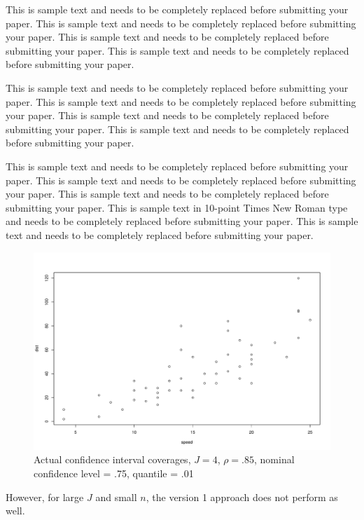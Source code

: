 \documentclass{asaproc}
\begin{document}
This is sample text and needs to be completely replaced before submitting your paper. This is sample text and needs to be completely replaced before submitting your paper. This is sample text and needs to be completely replaced before submitting your paper. This is sample text and needs to be completely replaced before submitting your paper.

This is sample text and needs to be completely replaced before submitting your paper. This is sample text and needs to be completely replaced before submitting your paper.  This is sample text and needs to be completely replaced before submitting your paper. This is sample text and needs to be completely replaced before submitting your paper.

This is sample text and needs to be completely replaced before submitting your paper. This is sample text and needs to be completely replaced before submitting your paper. This is sample text and needs to be completely replaced before submitting your paper. This is sample text in 10-point Times New Roman type and needs to be completely replaced before submitting your paper. This is sample text and needs to be completely replaced before submitting your paper.


\begin{figure}
\includegraphics{./Figs/unnamed-chunk-1-1.pdf}
\vspace{12pc}
\caption{Actual confidence interval coverages,
$J = 4$, $\rho = .85$, nominal confidence level = .75,
quantile = .01}
\end{figure}
However, for large $J$ and small $n$, the version 1 approach does not perform as well.
\end{document}
